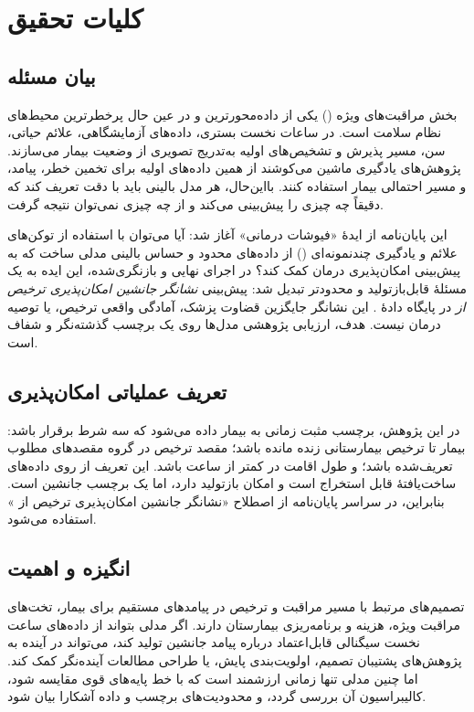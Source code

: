 \chapter{کلیات تحقیق}
\label{ch:introduction}

\section{بیان مسئله}
بخش مراقبت‌های ویژه () یکی از داده‌محورترین و در عین حال پرخطرترین محیط‌های نظام سلامت است. در ساعات نخست بستری، داده‌های آزمایشگاهی، علائم حیاتی، سن، مسیر پذیرش و تشخیص‌های اولیه به‌تدریج تصویری از وضعیت بیمار می‌سازند. پژوهش‌های یادگیری ماشین می‌کوشند از همین داده‌های اولیه برای تخمین خطر، پیامد، و مسیر احتمالی بیمار استفاده کنند. بااین‌حال، هر مدل بالینی باید با دقت تعریف کند که دقیقاً چه چیزی را پیش‌بینی می‌کند و از چه چیزی نمی‌توان نتیجه گرفت.

این پایان‌نامه از ایدۀ «فیوشات درمانی» آغاز شد: آیا می‌توان با استفاده از توکن‌های علائم و یادگیری چندنمونه‌ای () از داده‌های محدود و حساس بالینی مدلی ساخت که به پیش‌بینی امکان‌پذیری درمان کمک کند؟ در اجرای نهایی و بازنگری‌شده، این ایده به یک مسئلۀ قابل‌بازتولید و محدودتر تبدیل شد: پیش‌بینی \emph{نشانگر جانشین امکان‌پذیری ترخیص از } در پایگاه دادۀ . این نشانگر جایگزین قضاوت پزشک، آمادگی واقعی ترخیص، یا توصیه درمان نیست. هدف، ارزیابی پژوهشی مدل‌ها روی یک برچسب گذشته‌نگر و شفاف است.

\section{تعریف عملیاتی امکان‌پذیری}
در این پژوهش، برچسب مثبت زمانی به بیمار داده می‌شود که سه شرط برقرار باشد: بیمار تا ترخیص بیمارستانی زنده مانده باشد؛ مقصد ترخیص در گروه مقصدهای مطلوب تعریف‌شده باشد؛ و طول اقامت در  کمتر از  ساعت باشد. این تعریف از روی داده‌های ساخت‌یافتۀ  قابل استخراج است و امکان بازتولید دارد، اما یک برچسب جانشین است. بنابراین، در سراسر پایان‌نامه از اصطلاح «نشانگر جانشین امکان‌پذیری ترخیص از » استفاده می‌شود.

\section{انگیزه و اهمیت}
تصمیم‌های مرتبط با مسیر مراقبت و ترخیص در  پیامدهای مستقیم برای بیمار، تخت‌های مراقبت ویژه، هزینه و برنامه‌ریزی بیمارستان دارند. اگر مدلی بتواند از داده‌های  ساعت نخست سیگنالی قابل‌اعتماد درباره پیامد جانشین تولید کند، می‌تواند در آینده به پژوهش‌های پشتیبان تصمیم، اولویت‌بندی پایش، یا طراحی مطالعات آینده‌نگر کمک کند. اما چنین مدلی تنها زمانی ارزشمند است که با خط پایه‌های قوی مقایسه شود، کالیبراسیون آن بررسی گردد، و محدودیت‌های برچسب و داده آشکارا بیان شود.

